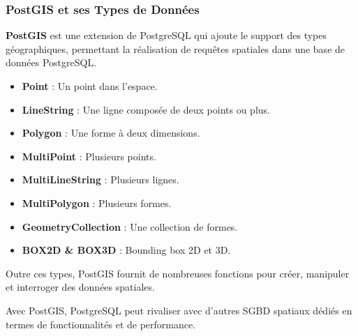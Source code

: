 \begin{frame}
  \frametitle{PostGIS et ses Types de Données}

  \textbf{PostGIS} est une extension de PostgreSQL qui ajoute le support des types géographiques, permettant la réalisation de requêtes spatiales dans une base de données PostgreSQL.

  \begin{itemize}
    \item \textbf{Point} : Un point dans l'espace.
    \item \textbf{LineString} : Une ligne composée de deux points ou plus.
    \item \textbf{Polygon} : Une forme à deux dimensions.
    \item \textbf{MultiPoint} : Plusieurs points.
    \item \textbf{MultiLineString} : Plusieurs lignes.
    \item \textbf{MultiPolygon} : Plusieurs formes.
    \item \textbf{GeometryCollection} : Une collection de formes.
    \item \textbf{BOX2D \& BOX3D} : Bounding box 2D et 3D.
  \end{itemize}

  Outre ces types, PostGIS fournit de nombreuses fonctions pour créer, manipuler et interroger des données spatiales.

  \vspace{0.25cm}
  Avec PostGIS, PostgreSQL peut rivaliser avec d'autres SGBD spatiaux dédiés en termes de fonctionnalités et de performance.

\end{frame}


